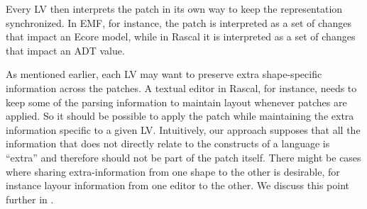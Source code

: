 
Every LV then interprets the patch in its own way to keep the representation synchronized.
In EMF, for instance, the patch is interpreted as a set of changes that impact an Ecore model, while in Rascal it is interpreted as a set of changes that impact an ADT value.

As mentioned earlier, each LV may want to preserve extra shape-specific information across the patches.
A textual editor in Rascal, for instance, needs to keep some of the parsing information to maintain layout whenever patches are applied.
So it should be possible to apply the patch while maintaining the extra information specific to a given LV.
Intuitively, our approach supposes that all the information that does not directly relate to the constructs of a language is ``extra'' and therefore should not be part of the patch itself.
There might be cases where sharing extra-information from one shape to the other is desirable, for instance layour information from one editor to the other.
We discuss this point further in .

